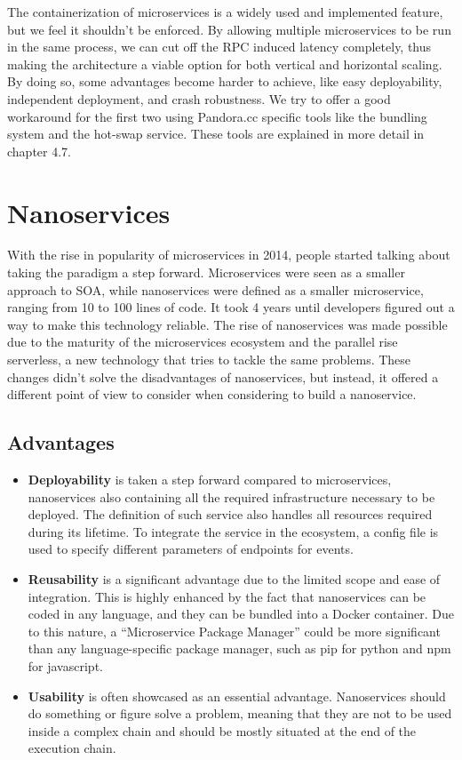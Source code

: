 The containerization of microservices is a widely used and implemented feature, but we feel it shouldn't be enforced. By allowing multiple microservices to be run in the same process, we can cut off the RPC induced latency completely, thus making the architecture a viable option for both vertical and horizontal scaling. By doing so, some advantages become harder to achieve, like easy deployability, independent deployment, and crash robustness. We try to offer a good workaround for the first two using Pandora.cc specific tools like the bundling system and the hot-swap service. These tools are explained in more detail in chapter 4.7.

\section{Nanoservices}
With the rise in popularity of microservices in 2014, people started talking about taking the paradigm a step forward. Microservices were seen as a smaller approach to SOA, while nanoservices were defined as a smaller microservice, ranging from 10 to 100 lines of code. It took 4 years until developers figured out a way to make this technology reliable. The rise of nanoservices was made possible due to the maturity of the microservices ecosystem and the parallel rise serverless, a new technology that tries to tackle the same problems. These changes didn’t solve the disadvantages of nanoservices, but instead, it offered a different point of view to consider when considering to build a nanoservice.

\subsection*{Advantages}
\begin{itemize}
\item \textbf{Deployability} is taken a step forward compared to microservices, nanoservices also containing all the required infrastructure necessary to be deployed. The definition of such service also handles all resources required during its lifetime. To integrate the service in the ecosystem, a config file is used to specify different parameters of endpoints for events.
\item \textbf{Reusability} is a significant advantage due to the limited scope and ease of integration. This is highly enhanced by the fact that nanoservices can be coded in any language, and they can be bundled into a Docker container. Due to this nature, a “Microservice Package Manager” could be more significant than any language-specific package manager, such as pip for python and npm for javascript.
\item \textbf{Usability} is often showcased as an essential advantage. Nanoservices should do something or figure solve a problem, meaning that they are not to be used inside a complex chain and should be mostly situated at the end of the execution chain.
\end{itemize}

